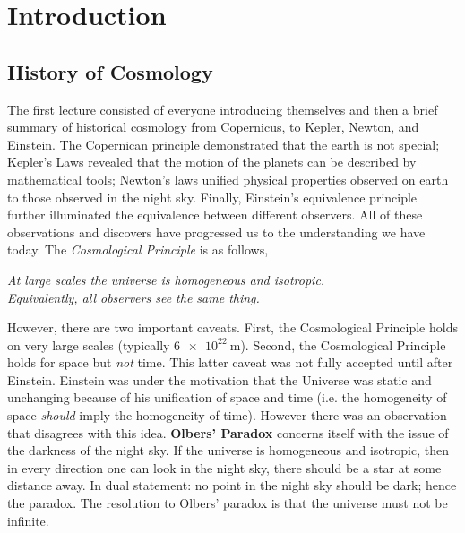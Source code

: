 \documentclass{article}
\begin{document}
\titlePage

\tableOfContents

\disclaimer

\section{Introduction}

\subsection{History of Cosmology}

The first lecture consisted of everyone introducing themselves and then a brief summary of historical cosmology from Copernicus, to Kepler, Newton, and Einstein. The Copernican principle demonstrated that the earth is not special; Kepler's Laws revealed that the motion of the planets can be described by mathematical tools; Newton's laws unified physical properties observed on earth to those observed in the night sky. Finally, Einstein's equivalence principle further illuminated the equivalence between different observers. All of these observations and discovers have progressed us to the understanding we have today. The \textit{Cosmological Principle} is as follows,

\begin{center}
    \textit{At large scales the universe is homogeneous and isotropic.}\\
    \textit{Equivalently, all observers see the same thing.}
\end{center}

However, there are two important caveats. First, the Cosmological Principle holds on very large scales (typically $\SI{6e22}{\m}$). Second, the Cosmological Principle holds for space but \textit{not} time. This latter caveat was not fully accepted until after Einstein. Einstein was under the motivation that the Universe was static and unchanging because of his unification of space and time (i.e. the homogeneity of space \textit{should} imply the homogeneity of time). However there was an observation that disagrees with this idea. \textbf{Olbers' Paradox} concerns itself with the issue of the darkness of the night sky. If the universe is homogeneous and isotropic, then in every direction one can look in the night sky, there should be a star at some distance away. In dual statement: no point in the night sky should be dark; hence the paradox. The resolution to Olbers' paradox is that the universe must not be infinite. \\
\end{document}

